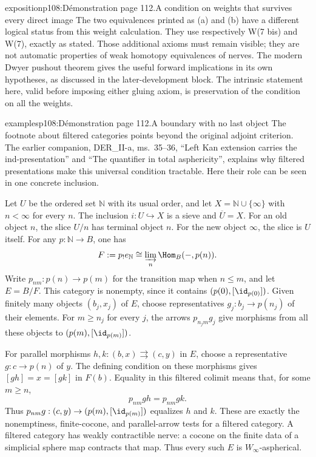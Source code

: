 \begin{dcomment}{exposition}{p108:Démonstration page 112.}{A condition on weights that survives every direct image}
The two equivalences printed as (a) and (b) have a different logical status from this weight calculation. They use respectively W(7 bis) and W(7), exactly as stated. Those additional axioms must remain visible; they are not automatic properties of weak homotopy equivalences of nerves. The modern Dwyer pushout theorem gives the useful forward implications in its own hypotheses, as discussed in the later-development block. The intrinsic statement here, valid before imposing either gluing axiom, is preservation of the condition on all the weights.
\end{dcomment}

\begin{dcomment}{examples}{p108:Démonstration page 112.}{A boundary with no last object}
The footnote about filtered categories points beyond the original adjoint criterion. The earlier companion, DER\_II-a, ms.~35--36, ``Left Kan extension carries the ind-presentation'' and ``The quantifier in total asphericity'', explains why filtered presentations make this universal condition tractable. Here their role can be seen in one concrete inclusion.

Let $U$ be the ordered set $\mathbb N$ with its usual order, and let $X=\mathbb N\cup\{\infty\}$ with $n<\infty$ for every $n$. The inclusion $i:U\hookrightarrow X$ is a sieve and $\overline U=X$. For an old object $n$, the slice $U/n$ has terminal object $n$. For the new object $\infty$, the slice is $U$ itself. For any $p:\mathbb N\to B$, one has
\[
 F:=p_!e_{\mathbb N}\cong\varinjlim_n\Hom_B(-,p(n)).
\]
Write $p_{nm}:p(n)\to p(m)$ for the transition map when $n\leq m$, and let $E=B/F$. This category is nonempty, since it contains $(p(0),[\id_{p(0)}])$. Given finitely many objects $(b_j,x_j)$ of $E$, choose representatives $g_j:b_j\to p(n_j)$ of their elements. For $m\geq n_j$ for every $j$, the arrows $p_{n_jm}g_j$ give morphisms from all these objects to $(p(m),[\id_{p(m)}])$.

For parallel morphisms $h,k:(b,x)\rightrightarrows(c,y)$ in $E$, choose a representative $g:c\to p(n)$ of $y$. The defining condition on these morphisms gives $[gh]=x=[gk]$ in $F(b)$. Equality in this filtered colimit means that, for some $m\geq n$,
\[
 p_{nm}gh=p_{nm}gk.
\]
Thus $p_{nm}g:(c,y)\to(p(m),[\id_{p(m)}])$ equalizes $h$ and $k$. These are exactly the nonemptiness, finite-cocone, and parallel-arrow tests for a filtered category. A filtered category has weakly contractible nerve: a cocone on the finite data of a simplicial sphere map contracts that map. Thus every such $E$ is $W_\infty$-aspherical.


\end{dcomment}
